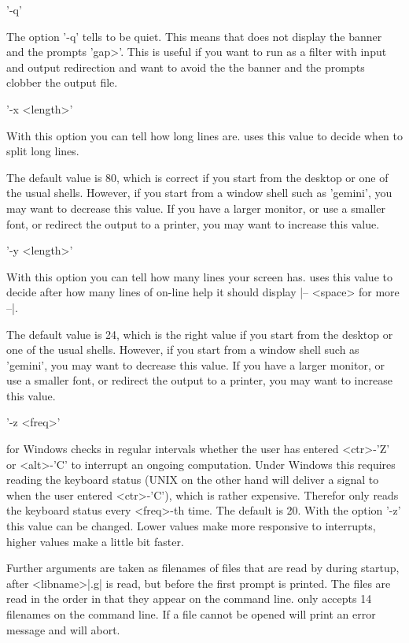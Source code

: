 '-q'

The  option '-q' tells  {\GAP} to be quiet.  This  means that {\GAP} does
not  display the banner and the  prompts 'gap>'.  This  is useful  if you
want to run {\GAP} as a filter with input and output redirection and want
to avoid the the banner and the prompts clobber the output file.

'-x <length>'

With this  option you can tell  {\GAP} how long   lines are.  {\GAP} uses
this value to decide when to split long lines.

The default value is 80,  which  is correct if  you start {\GAP} from the
desktop or one of the usual shells.  However, if you  start {\GAP} from a
window shell such as 'gemini', you may want to decrease  this  value.  If
you have a larger monitor, or use a smaller font, or  redirect the output
to a printer, you may want to increase this value.

'-y <length>'

With this  option you can  tell {\GAP} how  many lines  your  screen has.
{\GAP} uses this value to decide after how  many lines of on-line help it
should display |-- <space> for more --|.

The default value is  24, which is  the right value  if  you start {\GAP}
from the desktop or one  of  the  usual shells.   However, if  you  start
{\GAP} from a window  shell such as 'gemini',   you may want  to decrease
this value.  If  you  have a larger monitor,  or use  a smaller  font, or
redirect the output to a printer, you may want to increase this value.

'-z <freq>'

{\GAP} for  Windows  checks  in  regular  intervals  whether the user  has
entered    <ctr>-'Z' or <alt>-'C'  to   interrupt an ongoing computation.
Under Windows this requires reading the keyboard status (UNIX on the other
hand will deliver a  signal to {\GAP}  when the user  entered <ctr>-'C'),
which   is rather expensive.   Therefor   {\GAP} only reads the  keyboard
status  every <freq>-th time.  The  default is 20.   With the option '-z'
this value  can be changed.  Lower  values make {\GAP} more responsive to
interrupts, higher values make {\GAP} a little bit faster.

Further arguments are taken as filenames of files that are read by {\GAP}
during startup, after <libname>|\init.g| is read,  but  before  the first
prompt is  printed.  The files are read in the order in  that they appear
on  the command line.  {\GAP}  only  accepts 14 filenames on the  command
line.  If a file  cannot be opened {\GAP} will print an error message and
will abort.

